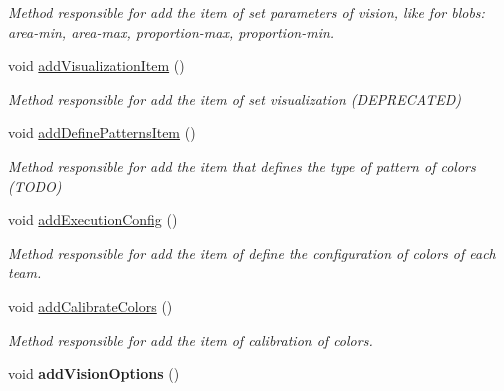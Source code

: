 \begin{DoxyCompactItemize}
\begin{DoxyCompactList}\small\item\em Method responsible for add the item of set parameters of vision, like for blobs\-: area-\/min, area-\/max, proportion-\/max, proportion-\/min. \end{DoxyCompactList}\item 
\hypertarget{classMainWindow_aa30ad88d5b5acbf1cc9f70840d416e24}{void \hyperlink{classMainWindow_aa30ad88d5b5acbf1cc9f70840d416e24}{add\-Visualization\-Item} ()}\label{classMainWindow_aa30ad88d5b5acbf1cc9f70840d416e24}

\begin{DoxyCompactList}\small\item\em Method responsible for add the item of set visualization (D\-E\-P\-R\-E\-C\-A\-T\-E\-D) \end{DoxyCompactList}\item 
\hypertarget{classMainWindow_a9f08218f96f231b1615ce24d933b15ce}{void \hyperlink{classMainWindow_a9f08218f96f231b1615ce24d933b15ce}{add\-Define\-Patterns\-Item} ()}\label{classMainWindow_a9f08218f96f231b1615ce24d933b15ce}

\begin{DoxyCompactList}\small\item\em Method responsible for add the item that defines the type of pattern of colors (T\-O\-D\-O) \end{DoxyCompactList}\item 
\hypertarget{classMainWindow_a4d645b048c765c34481cb4e7749af6cf}{void \hyperlink{classMainWindow_a4d645b048c765c34481cb4e7749af6cf}{add\-Execution\-Config} ()}\label{classMainWindow_a4d645b048c765c34481cb4e7749af6cf}

\begin{DoxyCompactList}\small\item\em Method responsible for add the item of define the configuration of colors of each team. \end{DoxyCompactList}\item 
\hypertarget{classMainWindow_a5fa2d31a87dcc532276b17ab49712add}{void \hyperlink{classMainWindow_a5fa2d31a87dcc532276b17ab49712add}{add\-Calibrate\-Colors} ()}\label{classMainWindow_a5fa2d31a87dcc532276b17ab49712add}

\begin{DoxyCompactList}\small\item\em Method responsible for add the item of calibration of colors. \end{DoxyCompactList}\item 
\hypertarget{classMainWindow_a84f4504e9262385ede0b0e89832181f9}{void {\bfseries add\-Vision\-Options} ()}\label{classMainWindow_a84f4504e9262385ede0b0e89832181f9}


\end{DoxyCompactItemize}
